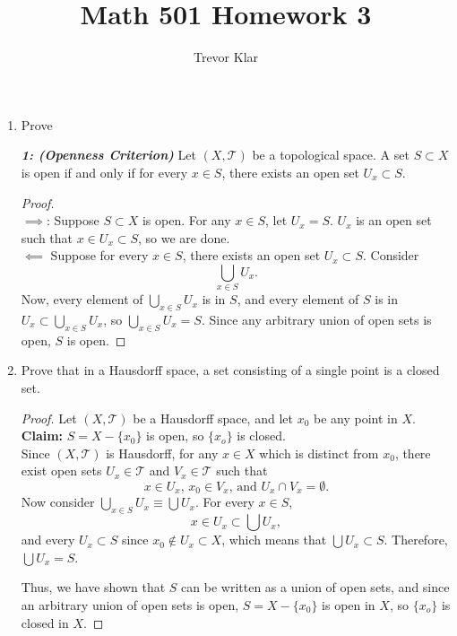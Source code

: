 \documentclass[letterpaper]{article}
\title{Math 501 \linebreak
Homework 3}
\author{Trevor Klar}
\newcommand{\T}{\mathcal{T}}
\begin{document}
\maketitle


\begin{enumerate}
\item Prove 

\begin{theorem*}\emph{\textbf{1: (Openness Criterion)}}
Let $(X, \T)$ be a topological space. A set $S \subset X$ is open if and only if for every $x \in S$, there exists an open set $U_x \subset S$. 
\end{theorem*}

\begin{proof}\mbox{}\\
$\implies$: Suppose $S \subset X$ is open. For any $x \in S$, let $U_x = S$. $U_x$ is an open set such that $x \in U_x \subset S$, so we are done. \qedwhite \\
$\impliedby$ Suppose for every $x \in S$, there exists an open set $U_x \subset S$. Consider 
$$\bigcup_{x\in S}U_x.$$
Now, every element of $\bigcup_{x\in S} U_x$ is in $S$, and every element of $S$ is in $U_x \subset \bigcup_{x\in S} U_x$, so $\bigcup_{x\in S} U_x = S$. Since any arbitrary union of open sets is open, $S$ is open. 
\end{proof}

\item Prove that in a Hausdorff space, a set consisting of a single point is a closed set. 

\begin{proof}
Let $(X,\T)$ be a Hausdorff space, and let $x_0$ be any point in $X$. \\
\textbf{Claim:} $S = X-\{x_0\}$ is open, so $\{x_o\}$ is closed.\\
Since $(X,\T)$ is Hausdorff, for any $x \in X$ which is distinct from $x_0$, there exist open sets $U_x \in \T$ and $V_x \in \T$ such that 
$$x \in U_x, \, x_0 \in V_x, \, \text{and }U_x\cap V_x=\emptyset.$$ 
Now consider $\bigcup_{x\in S}U_x \equiv \bigcup U_x$. For every $x \in S$, 
$$x \in U_x \subset \bigcup U_x, $$
and every $U_x \subset S$ since $x_0 \not\in U_x \subset X$, which means that $\bigcup U_x \subset S$. Therefore, $\bigcup U_x = S$.

Thus, we have shown that $S$ can be written as a union of open sets, and since an arbitrary union of open sets is open, $S = X-\{x_0\}$ is open in $X$, so $\{x_o\}$ is closed in $X$.
\end{proof}


\end{enumerate}
\end{document}
